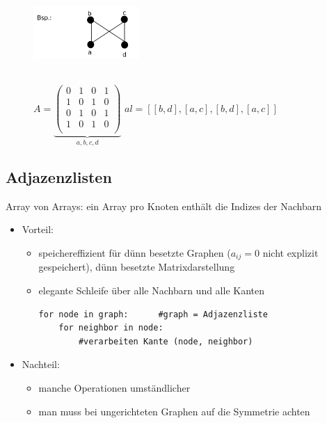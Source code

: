     \begin{figure}[htbp]
        \begin{minipage}[t]{4cm}
            \vspace{0cm}
            \includegraphics[width=4cm,height=3cm,keepaspectratio]{./Pictures/Adjazenzmatrix.png}
        \end{minipage}
        \begin{minipage}[t]{12cm}
            \vspace{0.0cm}
            $A = \underbrace{\begin{pmatrix}
            0 & 1 & 0 & 1 \\
            1 & 0 & 1 & 0 \\
            0 & 1 & 0 & 1 \\
            1 & 0 & 1 & 0 \\
            \end{pmatrix} }_{a, b, c, d}$ \hspace*{1cm} $al = [[b, d], [a, c], [b, d], [a,c]]$
        \end{minipage}
    \end{figure}

    \subsection*{Adjazenzlisten}
    Array von Arrays: ein Array pro Knoten enthält die Indizes der Nachbarn
    \begin{itemize}
        \item Vorteil:
        \begin{itemize}
            \item speichereffizient für dünn besetzte Graphen ($a_{ij} = 0$ nicht explizit gespeichert), \glqq dünn besetzte Matrixdarstellung\grqq
            \item elegante Schleife über alle Nachbarn und alle Kanten
            \begin{verbatim}
for node in graph:      #graph = Adjazenzliste
    for neighbor in node:
        #verarbeiten Kante (node, neighbor)
            \end{verbatim}
        \end{itemize}
        \item Nachteil:
        \begin{itemize}
            \item manche Operationen umständlicher
            \item man muss bei ungerichteten Graphen auf die Symmetrie achten
        \end{itemize}
    \end{itemize}

